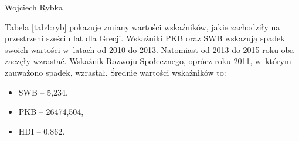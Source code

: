 \begin{artplenv}{Wojciech Rybka}
%

Tabela \ref{tab4:ryb} pokazuje zmiany wartości wskaźników, jakie zachodziły na przestrzeni sześciu lat dla Grecji. Wskaźniki PKB oraz
SWB wskazują spadek swoich wartości w~latach od 2010 do 2013. Natomiast od 2013 do 2015 roku oba zaczęły wzrastać.
Wskaźnik Rozwoju Społecznego, oprócz roku 2011, w~którym zauważono spadek, wzrastał. Średnie wartości wskaźników to:

\begin{itemize}
\item SWB -- 5,234,
\item PKB -- 26474,504,
\item HDI -- 0,862.
\end{itemize}



\end{artplenv}
